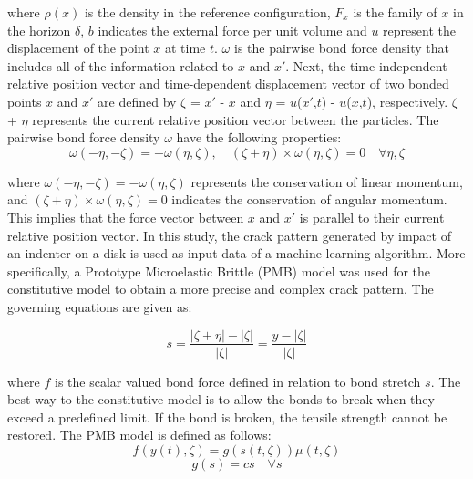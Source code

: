 \noindent where $\rho(x)$ is the density in the reference configuration, $F_x$ is the family of $x$ in the horizon $\delta$, $b$ indicates the external force per unit volume and $u$ represent the displacement of the point $x$ at time $t$. $\omega$ is the pairwise bond force density that includes all of the information related to $x$ and ${x'}$.
Next, the time-independent relative position vector and time-dependent displacement vector of two bonded points $x$ and ${x'}$ are defined by $\zeta$ = ${x'}$ - $x$ and $\eta$ = $u$(${x'}$,$t$) - $u$($x$,$t$), respectively.
$\zeta$ + $\eta$ represents the current relative position vector between the particles. The pairwise bond force density $\omega$ have the following properties: 
\begin{equation}
\omega(-\eta,-\zeta)= -\omega(\eta, \zeta),\quad(\zeta + \eta)\times\omega(\eta, \zeta)=0 \quad\forall\eta,\zeta
\end{equation}




\noindent where $\omega(-\eta,-\zeta)= -\omega(\eta, \zeta)$ represents the conservation of linear momentum, and $(\zeta + \eta)\times\omega(\eta, \zeta)=0$ indicates the conservation of angular momentum. This implies that the force vector between $x$ and ${x'}$ is parallel to their current relative position vector. In this study, the crack pattern generated by impact of an indenter on a disk is used as input data of a machine learning algorithm. More specifically, a Prototype Microelastic Brittle (PMB) model \cite{Ref4} was used for the constitutive model to obtain a more precise and complex crack pattern. The governing equations are given as: 

\begin{equation}
s=\frac{|\zeta+\eta|-|\zeta|}{|\zeta|}=\frac{y-|\zeta|}{|\zeta|}
\end{equation}

\noindent where $f$ is the scalar valued bond force defined in relation to bond stretch $s$. The best way {} to the constitutive model is to allow the bonds to break when they exceed a predefined limit. If the bond is broken, the tensile strength cannot be restored. The PMB model is defined as follows:
\begin{equation}
f(y(t),\zeta)=g(s(t,\zeta))\mu(t,\zeta)
\end{equation}
\begin{equation}
g(s)=cs \quad\forall s
\end{equation}

